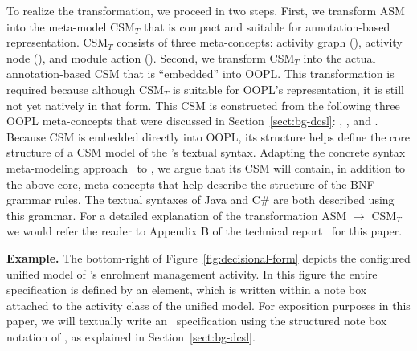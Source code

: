 To realize the transformation, we proceed in two steps. First, we transform ASM into the meta-model CSM$_T$ that is compact and suitable for annotation-based representation. CSM$_T$ consists of three meta-concepts: activity graph (), activity node (), and module action (). Second, we transform CSM$_T$ into the actual annotation-based CSM that is ``embedded'' into OOPL. This transformation is required because although CSM$_T$ is suitable for OOPL's representation, it is still not yet natively in that form. This CSM is constructed from the following three OOPL meta-concepts that were discussed in Section~\ref{sect:bg-dcsl}: , , and . Because CSM is embedded directly into OOPL, its structure helps define the core structure of a CSM model of the \agl's textual syntax. Adapting the concrete syntax meta-modeling approach~\cite{kleppe_software_2008} to \agl, we argue that its CSM will contain, in addition to the above core, meta-concepts that help describe the structure of the BNF grammar rules. The textual syntaxes of Java and C\# are both described using this grammar. For a detailed explanation of the transformation ASM $\rightarrow$ CSM$_T$ we would refer the reader to Appendix B of the technical report~\cite{dang2023aglTechReport} for this paper. 

\noindent \textbf{Example.} The bottom-right of Figure~\ref{fig:decisional-form} depicts the conﬁgured uniﬁed model of \courseman's enrolment management activity. In this figure the entire \agl~ specification is deﬁned by an  element, which is written within a note box
attached to the activity class  of the uniﬁed model. For exposition purposes in this paper, we will textually write an \agl~specification using the structured note box notation of \dcsl, as explained in Section~\ref{sect:bg-dcsl}. 

